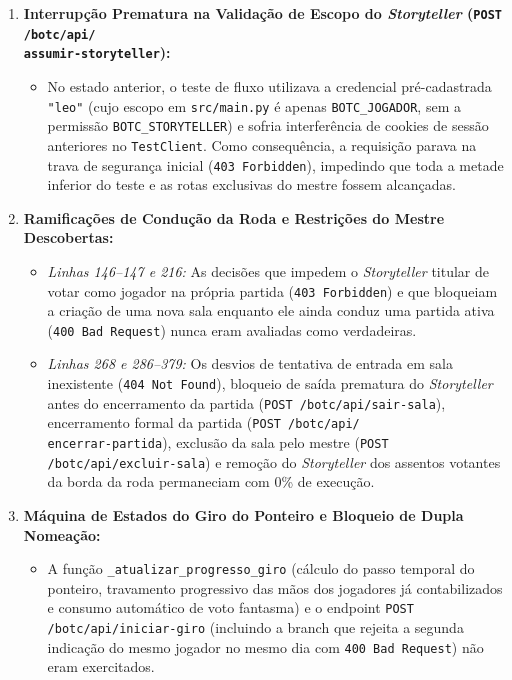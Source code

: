 \documentclass[12pt,a4paper]{article}
\begin{document}
\begin{enumerate}[leftmargin=1.5em]
    \item \textbf{Interrupção Prematura na Validação de Escopo do \textit{Storyteller} (\texttt{POST /botc/api/\\assumir-storyteller}):}
    \begin{itemize}
        \item No estado anterior, o teste de fluxo utilizava a credencial pré-cadastrada \texttt{"leo"} (cujo escopo em \texttt{src/main.py} é apenas \texttt{BOTC\_JOGADOR}, sem a permissão \texttt{BOTC\_STORYTELLER}) e sofria interferência de cookies de sessão anteriores no \texttt{TestClient}. Como consequência, a requisição parava na trava de segurança inicial (\texttt{403 Forbidden}), impedindo que toda a metade inferior do teste e as rotas exclusivas do mestre fossem alcançadas.
    \end{itemize}
    
    \item \textbf{Ramificações de Condução da Roda e Restrições do Mestre Descobertas:}
    \begin{itemize}
        \item \textit{Linhas 146--147 e 216:} As decisões que impedem o \textit{Storyteller} titular de votar como jogador na própria partida (\texttt{403 Forbidden}) e que bloqueiam a criação de uma nova sala enquanto ele ainda conduz uma partida ativa (\texttt{400 Bad Request}) nunca eram avaliadas como verdadeiras.
        \item \textit{Linhas 268 e 286--379:} Os desvios de tentativa de entrada em sala inexistente (\texttt{404 Not Found}), bloqueio de saída prematura do \textit{Storyteller} antes do encerramento da partida (\texttt{POST /botc/api/sair-sala}), encerramento formal da partida (\texttt{POST /botc/api/\\encerrar-partida}), exclusão da sala pelo mestre (\texttt{POST /botc/api/excluir-sala}) e remoção do \textit{Storyteller} dos assentos votantes da borda da roda permaneciam com 0\% de execução.
    \end{itemize}
    \item \textbf{Máquina de Estados do Giro do Ponteiro e Bloqueio de Dupla Nomeação:}
    \begin{itemize}
        \item A função \texttt{\_atualizar\_progresso\_giro} (cálculo do passo temporal do ponteiro, travamento progressivo das mãos dos jogadores já contabilizados e consumo automático de voto fantasma) e o endpoint \texttt{POST /botc/api/iniciar-giro} (incluindo a branch que rejeita a segunda indicação do mesmo jogador no mesmo dia com \texttt{400 Bad Request}) não eram exercitados.
    \end{itemize}
\end{enumerate}
\end{document}
